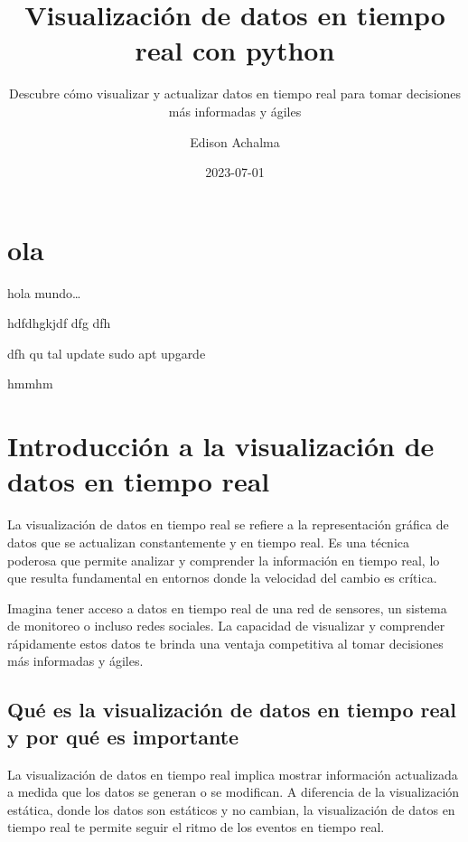 \documentclass[
  a4paper,
]{article}
\title{Visualización de datos en tiempo real con python}
\subtitle{Descubre cómo visualizar y actualizar datos en tiempo real
para tomar decisiones más informadas y ágiles}
\author{Edison Achalma}
\date{2023-07-01}
\begin{document}
\maketitle
\ifdefined\Shaded\renewenvironment{Shaded}{\begin{tcolorbox}[sharp corners, frame hidden, boxrule=0pt, interior hidden, borderline west={3pt}{0pt}{shadecolor}, enhanced, breakable]}{\end{tcolorbox}}\fi

\hypertarget{ola}{%
\section{ola}\label{ola}}

hola mundo\ldots{}

hdfdhgkjdf dfg dfh

dfh qu tal update sudo apt upgarde

hmmhm

\hypertarget{introducciuxf3n-a-la-visualizaciuxf3n-de-datos-en-tiempo-real}{%
\section{Introducción a la visualización de datos en tiempo
real}\label{introducciuxf3n-a-la-visualizaciuxf3n-de-datos-en-tiempo-real}}

La visualización de datos en tiempo real se refiere a la representación
gráfica de datos que se actualizan constantemente y en tiempo real. Es
una técnica poderosa que permite analizar y comprender la información en
tiempo real, lo que resulta fundamental en entornos donde la velocidad
del cambio es crítica.

Imagina tener acceso a datos en tiempo real de una red de sensores, un
sistema de monitoreo o incluso redes sociales. La capacidad de
visualizar y comprender rápidamente estos datos te brinda una ventaja
competitiva al tomar decisiones más informadas y ágiles.

\hypertarget{quuxe9-es-la-visualizaciuxf3n-de-datos-en-tiempo-real-y-por-quuxe9-es-importante}{%
\subsection{Qué es la visualización de datos en tiempo real y por qué es
importante}\label{quuxe9-es-la-visualizaciuxf3n-de-datos-en-tiempo-real-y-por-quuxe9-es-importante}}

La visualización de datos en tiempo real implica mostrar información
actualizada a medida que los datos se generan o se modifican. A
diferencia de la visualización estática, donde los datos son estáticos y
no cambian, la visualización de datos en tiempo real te permite seguir
el ritmo de los eventos en tiempo real.
\end{document}
